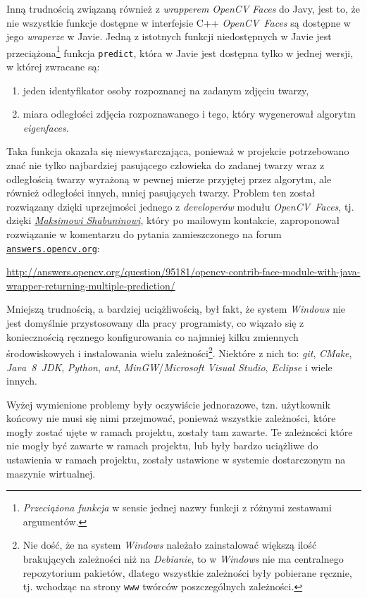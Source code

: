 \documentclass[a4paper,titlepage]{article}
\theoremstyle{break}
\numberwithin{equation}{subsection}
\begin{document}
Inną trudnością związaną również z \emph{wrapperem OpenCV Faces} do Javy, jest to, że nie wszystkie funkcje dostępne w interfejsie C++ \emph{OpenCV~Faces} są dostępne w jego \emph{wraperze} w Javie. Jedną z istotnych funkcji niedostępnych w Javie jest przeciążona\footnote{\emph{Przeciążona funkcja} w sensie jednej nazwy funkcji z różnymi zestawami argumentów.} funkcja \texttt{predict}, która w Javie jest dostępna tylko w jednej wersji, w której zwracane są:
\begin{enumerate}
	\item jeden identyfikator osoby rozpoznanej na zadanym zdjęciu twarzy,
	\item miara odległości zdjęcia rozpoznawanego i tego, który wygenerował algorytm \emph{eigenfaces}.
\end{enumerate}
Taka funkcja okazała się niewystarczająca, ponieważ w projekcie potrzebowano znać nie tylko najbardziej pasującego człowieka do zadanej twarzy wraz z odległością twarzy wyrażoną w pewnej mierze przyjętej przez algorytm, ale również odległości innych, mniej pasujących twarzy. Problem ten został rozwiązany dzięki uprzejmości jednego z \emph{developerów} modułu \emph{OpenCV~Faces}, tj. dzięki \href{https://github.com/mshabunin}{\emph{Maksimowi Shabuninowi}}, który po mailowym kontakcie, zaproponował rozwiązanie w komentarzu do pytania zamieszczonego na forum \href{http://answers.opencv.org}{\texttt{answers.opencv.org}}:
\begin{center}
\url{http://answers.opencv.org/question/95181/opencv-contrib-face-module-with-java-wrapper-returning-multiple-prediction/}
\end{center}

Mniejszą trudnością, a bardziej uciążliwością, był fakt, że system \emph{Windows} nie jest domyślnie przystosowany dla pracy programisty, co wiązało się z koniecznością ręcznego konfigurowania co najmniej kilku zmiennych środowiskowych i instalowania wielu zależności\footnote{Nie dość, że na system \emph{Windows} należało zainstalować większą ilość brakujących zależności niż na \emph{Debianie}, to w \emph{Windows} nie ma centralnego repozytorium pakietów, dlatego wszystkie zależności były pobierane ręcznie, tj. wchodząc na strony \texttt{www} twórców poszczególnych zależności.}. Niektóre z nich to: \emph{git}, \emph{CMake}, \emph{Java~8~JDK}, \emph{Python}, \emph{ant}, \emph{MinGW}/\emph{Microsoft Visual Studio}, \emph{Eclipse} i wiele innych.

Wyżej wymienione problemy były oczywiście jednorazowe, tzn. użytkownik końcowy nie musi się nimi przejmować, ponieważ wszystkie zależności, które mogły zostać ujęte w ramach projektu, zostały tam zawarte. Te zależności które nie mogły być zawarte w ramach projektu, lub były bardzo uciążliwe do ustawienia w ramach projektu, zostały ustawione w systemie dostarczonym na maszynie wirtualnej.
\end{document}

